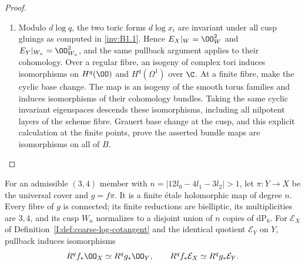 \begin{proof}
\begin{enumerate}[label={$\langle1\rangle$\arabic*.},leftmargin=*]
\item Modulo $d\log q$, the two toric forms $d\log x_i$ are invariant
under all cusp gluings as computed in \ref{inv:B1.1}. Hence
$E_X|_W=\OO_W^2$ and $E_Y|_{W_n}=\OO_{W_n}^2$,
and the same pullback argument applies to their cohomology.
Over a regular fibre, an isogeny of complex tori induces isomorphisms
on $H^q(\OO)$ and $H^q(\Omega^1)$ over $\C$.
At a finite fibre, make the cyclic base change. The map is an isogeny
of the smooth torus families and induces isomorphisms of their
cohomology bundles. Taking the same cyclic invariant eigenspaces
descends these isomorphisms, including all nilpotent layers of the
scheme fibre. Grauert base change at the cusp, and this explicit
calculation at the finite points, prove the asserted bundle maps are
isomorphisms on all of $B$.
\end{enumerate}
\end{proof}

\begin{proposition}\hypertarget{tag-01S7}{}\label{inv:B3.1}

For an admissible $(3,4)$ member with
$n=|12l_0-4l_1-3l_2|>1$, let $\pi:Y\to X$ be the universal
cover and $g=f\pi$. It is a finite \'etale holomorphic map of degree $n$.
Every fibre of $g$ is connected; its finite reductions are bielliptic,
its multiplicities are $3,4$, and its cusp $W_n$ normalizes to a
disjoint union of $n$ copies of $\mathrm{dP}_6$.
For $\mathcal E_X$ of Definition~\ref{I:def:coarse-log-cotangent}
and the identical quotient $\mathcal E_Y$ on $Y$, pullback induces isomorphisms
\[
R^qf_*\OO_X\simeq R^qg_*\OO_Y,\qquad
R^qf_*\mathcal E_X\simeq R^qg_*\mathcal E_Y.
\]
\end{proposition}


